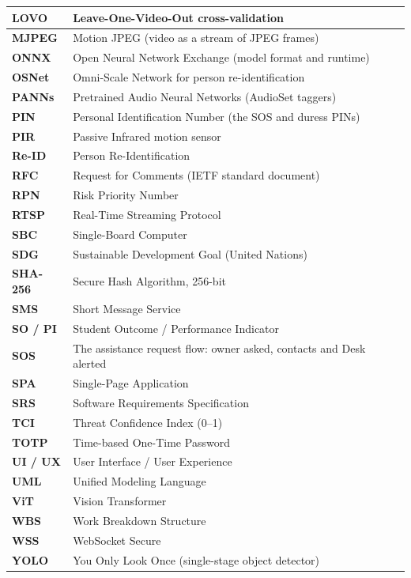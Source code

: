 \begin{longtable}{@{}L{2.6cm}L{11.6cm}@{}}
\textbf{LOVO} & Leave-One-Video-Out cross-validation\\ \hline
\textbf{MJPEG} & Motion JPEG (video as a stream of JPEG frames)\\ \hline
\textbf{ONNX} & Open Neural Network Exchange (model format and runtime)\\ \hline
\textbf{OSNet} & Omni-Scale Network for person re-identification\\ \hline
\textbf{PANNs} & Pretrained Audio Neural Networks (AudioSet taggers)\\ \hline
\textbf{PIN} & Personal Identification Number (the SOS and duress PINs)\\ \hline
\textbf{PIR} & Passive Infrared motion sensor\\ \hline
\textbf{Re-ID} & Person Re-Identification\\ \hline
\textbf{RFC} & Request for Comments (IETF standard document)\\ \hline
\textbf{RPN} & Risk Priority Number\\ \hline
\textbf{RTSP} & Real-Time Streaming Protocol\\ \hline
\textbf{SBC} & Single-Board Computer\\ \hline
\textbf{SDG} & Sustainable Development Goal (United Nations)\\ \hline
\textbf{SHA-256} & Secure Hash Algorithm, 256-bit\\ \hline
\textbf{SMS} & Short Message Service\\ \hline
\textbf{SO / PI} & Student Outcome / Performance Indicator\\ \hline
\textbf{SOS} & The assistance request flow: owner asked, contacts and Desk alerted\\ \hline
\textbf{SPA} & Single-Page Application\\ \hline
\textbf{SRS} & Software Requirements Specification\\ \hline
\textbf{TCI} & Threat Confidence Index (0--1)\\ \hline
\textbf{TOTP} & Time-based One-Time Password\\ \hline
\textbf{UI / UX} & User Interface / User Experience\\ \hline
\textbf{UML} & Unified Modeling Language\\ \hline
\textbf{ViT} & Vision Transformer\\ \hline
\textbf{WBS} & Work Breakdown Structure\\ \hline
\textbf{WSS} & WebSocket Secure\\ \hline
\textbf{YOLO} & You Only Look Once (single-stage object detector)\\ \hline
\end{longtable}
\endgroup
\clearpage
